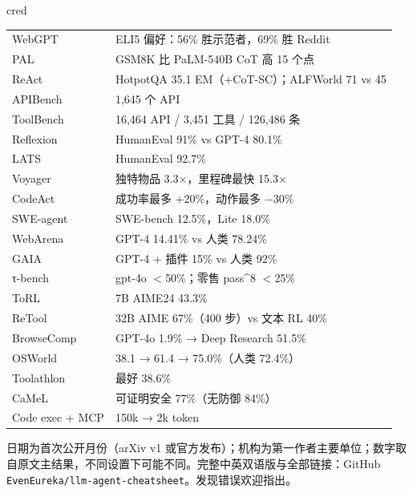 \documentclass[8pt]{extarticle}
\begin{document}
\begin{minipage}[t]{0.365\linewidth}\vspace{0pt}
\begin{tbox}[title={关键数字速记}]{cred}\normalsize\renewcommand{\arraystretch}{1.12}
\begin{tabularx}{\linewidth}{@{}l Y@{}}
\toprule
WebGPT & ELI5 偏好：56\% 胜示范者，69\% 胜 Reddit\\
PAL & GSM8K 比 PaLM-540B CoT 高 15 个点\\
ReAct & HotpotQA 35.1 EM（+CoT-SC）；ALFWorld 71 vs 45\\
APIBench & 1,645 个 API\\
ToolBench & 16,464 API / 3,451 工具 / 126,486 条\\
Reflexion & HumanEval 91\% vs GPT-4 80.1\%\\
LATS & HumanEval 92.7\%\\
Voyager & 独特物品 3.3×，里程碑最快 15.3×\\
CodeAct & 成功率最多 +20\%，动作最多 −30\%\\
SWE-agent & SWE-bench 12.5\%，Lite 18.0\%\\
WebArena & GPT-4 14.41\% vs 人类 78.24\%\\
GAIA & GPT-4 + 插件 15\% vs 人类 92\%\\
τ-bench & gpt-4o $<$50\%；零售 pass\^{}8 $<$25\%\\
ToRL & 7B AIME24 43.3\%\\
ReTool & 32B AIME 67\%（400 步）vs 文本 RL 40\%\\
BrowseComp & GPT-4o 1.9\% → Deep Research 51.5\%\\
OSWorld & 38.1 → 61.4 → 75.0\%（人类 72.4\%）\\
Toolathlon & 最好 38.6\%\\
CaMeL & 可证明安全 77\%（无防御 84\%）\\
Code exec + MCP & 150k → 2k token\\
\bottomrule
\end{tabularx}
\end{tbox}
\end{minipage}

\vfill
{\scriptsize\color{cgray}日期为首次公开月份（arXiv v1 或官方发布）；机构为第一作者主要单位；数字取自原文主结果，不同设置下可能不同。完整中英双语版与全部链接：GitHub \texttt{EvenEureka/llm-agent-cheatsheet}。发现错误欢迎指出。}
\end{document}
